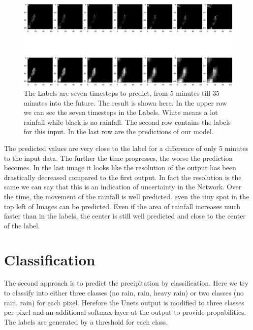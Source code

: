 \documentclass[oneside]{htwg-report}
\begin{document}
\begin{figure}[ht]
\centering
\includegraphics[width=\linewidth]{../pics/t5}
\caption{The Labels are seven timesteps to predict, from 5 minutes till 35 minutes into the future. The result is shown here. In the upper row we can see the seven timesteps in the Labels. White means a lot rainfall while black is no rainfall.
The second row contains the labels for this input. In the last row are the predictions of our model.}
\end{figure}

The predicted values are very close to the label for a difference of only 5 minutes to the input data. The further the time progresses, the worse the prediction becomes.
In the last image it looks like the resolution of the output has been drastically decreased compared to the first output. 
In fact the resolution is the same we can say that this is an indication of uncertainty in the Network.
Over the time, the movement of the rainfall is well predicted. even the tiny spot in the top left of Images can be predicted.
Even if the area of rainfall increases much faster than in the labels, the center is still well predicted and close to the center of the label.

\section*{Classification}
The second approach is to predict the precipitation by classification. Here we try to classify into either three classes (no rain, rain, heavy rain) or two classes (no rain, rain) for each pixel.
Herefore the Unets output is modified to three classes per pixel and an additional softmax layer at the output to provide propabilities. The labels are generated by a threshold for each class.
\end{document}
